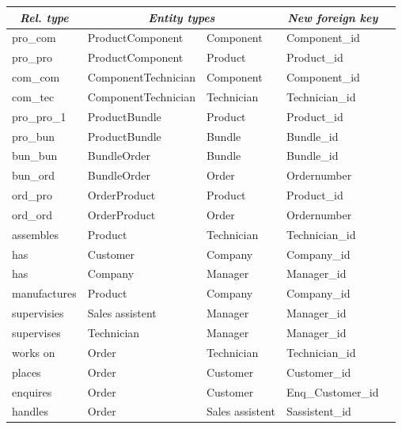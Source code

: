 \documentclass[11pt]{article}
\begin{document}
\noindent
\begin{tabular}[t]{*{5}{l}}
\hline
\multicolumn{1}{c|}{\emph{Rel. type}}      &
\multicolumn{2}{c|}{\emph{Entity types}}   &
\multicolumn{1}{c}{\emph{New foreign key}} \\
\hline
pro\_com     & ProductComponent    & Component       & Component\_id     \\
pro\_pro     & ProductComponent    & Product         & Product\_id       \\
com\_com     & ComponentTechnician & Component       & Component\_id     \\
com\_tec     & ComponentTechnician & Technician      & Technician\_id    \\
pro\_pro\_1  & ProductBundle       & Product         & Product\_id       \\
pro\_bun     & ProductBundle       & Bundle          & Bundle\_id        \\
bun\_bun     & BundleOrder         & Bundle          & Bundle\_id        \\
bun\_ord     & BundleOrder         & Order           & Ordernumber       \\
ord\_pro	 & OrderProduct        & Product         & Product\_id       \\
ord\_ord     & OrderProduct        & Order           & Ordernumber       \\
assembles    & Product             & Technician      & Technician\_id    \\
has          & Customer            & Company         & Company\_id       \\
has	         & Company             & Manager         & Manager\_id       \\
manufactures & Product             & Company         & Company\_id       \\
supervisies  & Sales assistent     & Manager         & Manager\_id       \\
supervises   & Technician          & Manager         & Manager\_id       \\
works on     & Order               & Technician      & Technician\_id    \\
places       & Order               & Customer        & Customer\_id      \\
enquires     & Order               & Customer        & Enq\_Customer\_id \\
handles	     & Order               & Sales assistent & Sassistent\_id    \\
\hline
\end{tabular}
\end{document}
